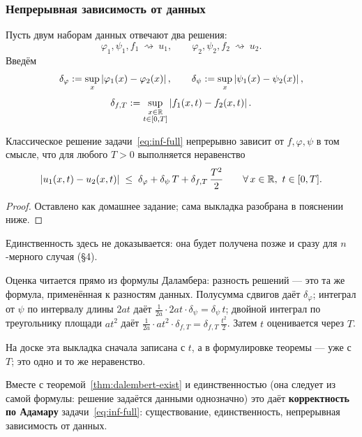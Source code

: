 \subsubsection*{Непрерывная зависимость от данных}

Пусть двум наборам данных отвечают два решения:
\[
  \varphi_1, \psi_1, f_1 \ \rightsquigarrow\ u_1,
  \qquad
  \varphi_2, \psi_2, f_2 \ \rightsquigarrow\ u_2 .
\]
Введём
\[
  \delta_\varphi := \sup_x \left\lvert \varphi_1(x) - \varphi_2(x) \right\rvert, \qquad
  \delta_\psi := \sup_x \left\lvert \psi_1(x) - \psi_2(x) \right\rvert,
\]
\[
  \delta_{f,T} := \sup_{\substack{x \in \mathbb{R} \\ t \in [0,T]}}
    \left\lvert f_1(x,t) - f_2(x,t) \right\rvert .
\]

\begin{theorem}
Классическое решение задачи~\eqref{eq:inf-full} непрерывно зависит от
$f, \varphi, \psi$ в том смысле, что для любого $T > 0$ выполняется неравенство
\[
  \left\lvert u_1(x,t) - u_2(x,t) \right\rvert \;\le\; \delta_\varphi + \delta_\psi\, T
    + \delta_{f,T}\,\frac{T^2}{2}
  \qquad \forall\, x\in\mathbb{R},\ t \in [0,T] .
\]
\end{theorem}

\begin{proof}
Оставлено как домашнее задание; сама выкладка разобрана в пояснении ниже.
\end{proof}

Единственность здесь не доказывается: она будет получена позже и сразу для
$n$-мерного случая (\S4).

\begin{idea}
Оценка читается прямо из формулы Даламбера: разность решений — это та же формула,
применённая к разностям данных. Полусумма сдвигов даёт $\delta_\varphi$; интеграл
от $\psi$ по интервалу длины $2at$ даёт
$\frac{1}{2a}\cdot 2at \cdot \delta_\psi = \delta_\psi\, t$; двойной интеграл по
треугольнику площади $a t^2$ даёт
$\frac{1}{2a}\cdot a t^2 \cdot \delta_{f,T} = \delta_{f,T}\,\frac{t^2}{2}$. Затем
$t$ оценивается через $T$.

\medskip
На доске эта выкладка сначала записана с $t$, а в формулировке теоремы — уже с
$T$; это одно и то же неравенство.

\medskip
Вместе с теоремой~\ref{thm:dalembert-exist} и единственностью (она следует из
самой формулы: решение задаётся данными однозначно) это даёт
\textbf{корректность по Адамару} задачи~\eqref{eq:inf-full}: существование,
единственность, непрерывная зависимость от данных.
\end{idea}
